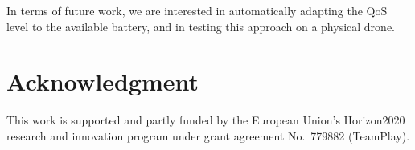 \documentclass[conference, onecolumn, draftclsnofoot]{IEEEtran}
\begin{document}

In terms of future work, we are interested in automatically adapting
the QoS level to the available battery, and in testing this approach
on a physical drone.

\section*{Acknowledgment}

This work is supported and partly funded by the European Union’s
Horizon2020 research and innovation program under grant agreement
No.~779882 (TeamPlay).


 
\vspace{1ex}
\end{document}
